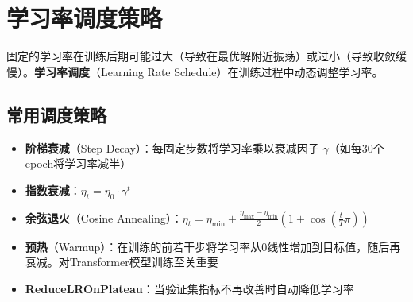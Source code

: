 \section{学习率调度策略}

固定的学习率在训练后期可能过大（导致在最优解附近振荡）或过小（导致收敛缓慢）。\textbf{学习率调度}（Learning Rate Schedule）在训练过程中动态调整学习率。

\subsection{常用调度策略}

\begin{itemize}
    \item \textbf{阶梯衰减}（Step Decay）：每固定步数将学习率乘以衰减因子 $\gamma$（如每30个epoch将学习率减半）
    \item \textbf{指数衰减}：$\eta_t = \eta_0 \cdot \gamma^t$
    \item \textbf{余弦退火}（Cosine Annealing）：$\eta_t = \eta_{\min} + \frac{\eta_{\max} - \eta_{\min}}{2}\left(1 + \cos\left(\frac{t}{T}\pi\right)\right)$
    \item \textbf{预热}（Warmup）：在训练的前若干步将学习率从0线性增加到目标值，随后再衰减。对Transformer模型训练至关重要
    \item \textbf{ReduceLROnPlateau}：当验证集指标不再改善时自动降低学习率
\end{itemize}

